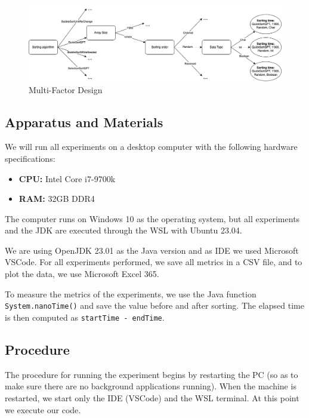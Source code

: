 \documentclass{article}
\begin{document}
        \begin{figure}[!h]
            \centering
            \includegraphics[width=1\linewidth]{MultiFactorDesign.png}
            \caption{Multi-Factor Design}
            \label{fig:multifactorDesign}
        \end{figure}

        \FloatBarrier

    \subsection{Apparatus and Materials}
        We will run all experiments on a desktop computer with the following hardware specifications:
        \begin{itemize}
            \item \textbf{CPU:} Intel Core i7-9700k
            \item \textbf{RAM:} 32GB DDR4
        \end{itemize}
        
        The computer runs on Windows 10 as the operating system, but all experiments and the JDK are executed through the WSL with Ubuntu 23.04.
        
        We are using OpenJDK 23.01 as the Java version and as IDE we used Microsoft VSCode. For all experiments performed, we save all metrics in a CSV file, and to plot the data, we use Microsoft Excel 365.
        
        To measure the metrics of the experiments, we use the Java function \texttt{System.nanoTime()} and save the value before and after sorting. The elapsed time is then computed as \texttt{startTime - endTime}.

    \subsection{Procedure}
        The procedure for running the experiment begins by restarting the PC (so as to make sure there are no background applications running). When the machine is restarted, we start only the IDE (VSCode) and the WSL terminal. At this point we execute our code.
        
\end{document}
